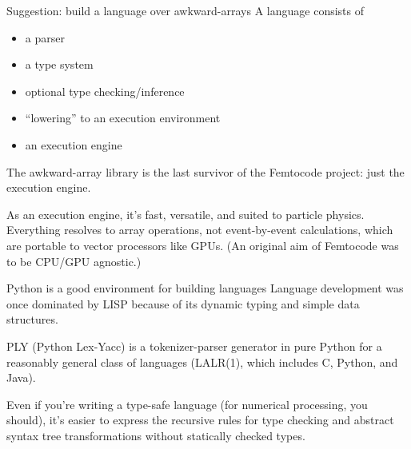 \documentclass[aspectratio=169]{beamer}
\begin{document}
\begin{frame}{Suggestion: build a language over awkward-arrays}
\large
\vspace{0.5 cm}
A language consists of
\begin{itemize}
\item a parser
\item a type system
\item optional type checking/inference
\item ``lowering'' to an execution environment
\item an execution engine
\end{itemize}

\vspace{0.5 cm}
The awkward-array library is the last survivor of the Femtocode project: just the execution engine.

\vspace{0.5 cm}
As an execution engine, it's fast, versatile, and suited to particle physics. Everything resolves to array operations, not event-by-event calculations, which are portable to vector processors like GPUs. (An original aim of Femtocode was to be CPU/GPU agnostic.)
\end{frame}

\begin{frame}{Python is a good environment for building languages}
\vspace{0.5 cm}
Language development was once dominated by LISP because of its dynamic typing and simple data structures.

\vspace{0.5 cm}
PLY (Python Lex-Yacc) is a tokenizer-parser generator in pure Python for a reasonably general class of languages (LALR(1), which includes C, Python, and Java).

\vspace{0.5 cm}
Even if you're writing a type-safe language (for numerical processing, you should), it's easier to express the recursive rules for type checking and abstract syntax tree transformations without statically checked types.
\end{frame}
\end{document}
